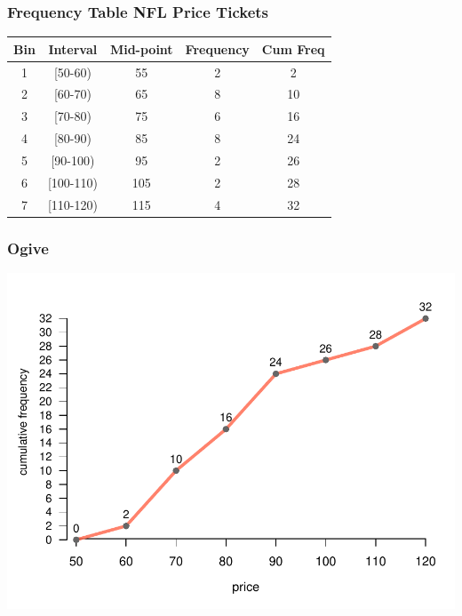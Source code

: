 \documentclass[12pt]{beamer}\usepackage[]{graphicx}\usepackage[]{color}
\newenvironment{knitrout}{}{} %
\begin{document}

\begin{frame}
\frametitle{Frequency Table NFL Price Tickets}

\begin{center}
 \begin{tabular}{c c c c c}
  \hline
  Bin & Interval & Mid-point & Frequency & Cum Freq \\
  \hline
  1 & [50-60) & 55 & 2 & 2 \\
  2 & [60-70) & 65 & 8 & 10 \\
  3 & [70-80) & 75 & 6 & 16 \\
  4 & [80-90) & 85 & 8 & 24 \\
  5 & [90-100) & 95 & 2 & 26 \\
  6 & [100-110) & 105 & 2 & 28 \\
  7 & [110-120) & 115 & 4 & 32 \\
 \end{tabular}
\end{center}

\end{frame}


\begin{frame}[fragile]
\frametitle{Ogive}
\begin{knitrout}\footnotesize
{}\color{fgcolor}

{\centering \includegraphics[width=.9\linewidth,height=.65\linewidth]{figure/unnamed-chunk-27-1} 

}



\end{knitrout}

\end{frame}
\end{document}
